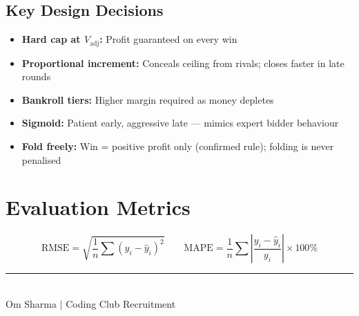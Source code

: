 \documentclass[12pt,a4paper]{article}
\begin{document}
\subsection{Key Design Decisions}
\begin{itemize}
  \item \textbf{Hard cap at $V_{\text{adj}}$:} Profit guaranteed on every win
  \item \textbf{Proportional increment:} Conceals ceiling from rivals; closes faster in late rounds
  \item \textbf{Bankroll tiers:} Higher margin required as money depletes
  \item \textbf{Sigmoid:} Patient early, aggressive late — mimics expert bidder behaviour
  \item \textbf{Fold freely:} Win = positive profit only (confirmed rule); folding is never penalised
\end{itemize}

\section{Evaluation Metrics}
\begin{formulabox}
\[\text{RMSE}=\sqrt{\frac{1}{n}\sum(y_i-\hat{y}_i)^2}\qquad\text{MAPE}=\frac{1}{n}\sum\left|\frac{y_i-\hat{y}_i}{y_i}\right|\times100\%\]
\end{formulabox}

\vfill\begin{center}\rule{0.5\linewidth}{0.4pt}\\[0.3em]
{\small Om Sharma $|$ Coding Club Recruitment}\end{center}
\end{document}
